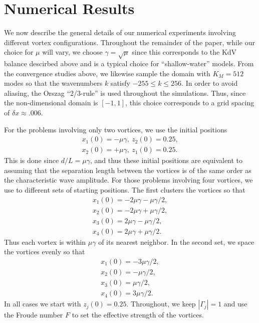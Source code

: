 \documentclass[a4paper,11pt]{article}
\begin{document}
\section{Numerical Results}

We now describe the general details of our numerical experiments involving different vortex configurations.  Throughout the remainder of the paper, while our choice for $\mu$ will vary, we choose $\gamma = \sqrt{\mu}$ since this corresponds to the KdV balance descirbed above and is a typical choice for ``shallow-water'' models.  From the convergence studies above, we likewise sample the domain with $K_{M} = 512$ modes so that the wavenumbers $k$ satisfy $-255\leq k \leq 256$.  In order to avoid aliasing, the Orszag ``2/3-rule'' is used throughout the simulations.  Thus, since the non-dimensional domain is $[-1,1]$, this choice corresponds to a grid spacing of $\delta x \approx .006$.  

For the problems involving only two vortices, we use the initial positions
\begin{align*}
x_{1}(0)=-\mu\gamma, \ z_{2}(0)=0.25, \\
x_{2}(0)=+\mu\gamma, \  z_{1}(0)=0.25.
\end{align*}
This is done since $d/L=\mu\gamma$, and thus these initial positions are equivalent to assuming that the separation length between the vortices is of the same order as the characteristic wave amplitude.  For those problems involving four vortices, we use to different sets of starting positions.  The first clusters the vortices so that  
\begin{align*}
x_{1}(0)=-2\mu\gamma-\mu\gamma/2,  \\ x_{2}(0)=-2\mu\gamma+\mu\gamma/2,\\ 
x_{3}(0)=2\mu\gamma-\mu\gamma/2,   \\ x_{4}(0)=2\mu\gamma+\mu\gamma/2.
\end{align*}
Thus each vortex is within $\mu\gamma$ of its nearest neighbor.  In the second set, we space the vortices evenly so that 
\begin{align*}
x_{1}(0)=-3\mu\gamma/2,  \\ x_{2}(0)=-\mu\gamma/2,\\ 
x_{3}(0)=\mu\gamma/2,   \\ x_{4}(0)=3\mu\gamma/2.
\end{align*}
In all cases we start with $z_{j}(0)=0.25$.  Throughout, we keep $|\Gamma_{j}|=1$ and use the Froude number $F$ to set the effective strength of the vortices.  
\end{document}
